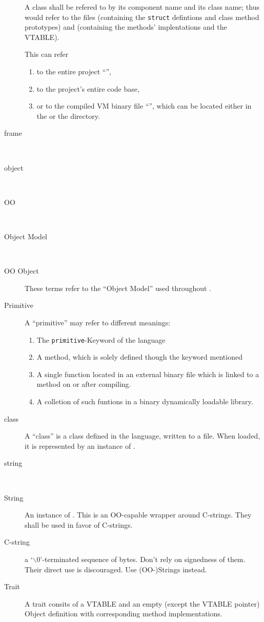 \begin{description}
  A class shall be refered to by its component name and its class name;
  thus  would refer to the files
   (containing the \lstinline|struct|
  defintions and class method prototypes) and
   (containing the methods' implentations
  and the VTABLE).
\item[\CSOM] This can refer
  \begin{enumerate}
  \item to the entire project ``\CSOM'',
  \item to the project's entire code base,
  \item or to the compiled VM binary file ``\CSOM'', which can be
    located either in the  or the  directory.
  \end{enumerate}
\item[frame]~
\item[object]~
\item[OO]~
\item[Object Model]~
\item[OO Object] These terms refer to the ``Object Model'' used
  throughout \CSOM.
\item[Primitive] A ``primitive'' may refer to different meanings:
  \begin{enumerate}
  \item The \lstinline[language=SOM]|primitive|-Keyword of the \SOM language
  \item A \SOM method, which is solely defined though the keyword mentioned
  \item A single \C function located in an external binary file which is linked
    to a \SOM method on or after compiling.
  \item A colletion of such \C funtions in a binary dynamically loadable library.
  \end{enumerate}
\item[\SOM class] A ``\SOM class'' is a class defined in the \SOM language,
  written to a file. When loaded, it is represented by an instance of
.
\item[string]~
\item[String] An instance of . This is an OO-capable
  wrapper around C-strings. They shall be used in favor of C-strings.
\item[C-string] a `$\backslash 0$'-terminated sequence of bytes. Don't
  rely on signedness of them. Their direct use is discouraged. Use 
  (OO-)Strings instead.
\item[Trait] 
A trait consits of a VTABLE and an empty (except the VTABLE
pointer) Object definition with corresponding method implementations.


\end{description}
